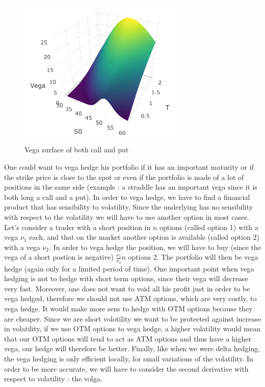 \documentclass[hidelinks]{article}
\begin{document}
    
    \begin{figure}[!h]
	\centering
	\includegraphics[width=0.7\textwidth]{vega.png}
    \caption{Vega surface of both call and put}
    \label{fig:vega}
    \end{figure}
    
    One could want to vega hedge his portfolio if it has an important maturity or if the strike price is close to the spot or even if the portfolio is made of a lot of positions in the same side (example : a straddle has an important vega since it is both long a call and a put). In order to vega hedge, we have to find a financial product that has sensibility to volatility. Since the underlying has no sensibility with respect to the volatility we will have to use another option in most cases. Let's consider a trader with a short position in $n$ options (called option 1) with a vega $\nu_1$ each, and that on the market another option is available (called option 2) with a vega $\nu_2$. In order to vega hedge the position, we will have to buy (since the vega of a short postion is negative) $\frac{\nu_1}{\nu_2}n$ options 2. The portfolio will then be vega hedge (again only for a limited period of time). One important point when vega hedging is not to hedge with short term options, since their vega will decrease very fast. Moreover, one does not want to void all his profit just in order to be vega hedged, therefore we should not use ATM options, which are very costly, to vega hedge. It would make more sens to hedge with OTM options because they are cheaper. Since we are short volotility we want to be protected against increase in volatility, if we use OTM options to vega hedge, a higher volatility would mean that our OTM options will tend to act as ATM options and thus have a higher vega, our hedge will therefore be better.  Finally, like when we were delta hedging, the vega hedging is only efficient locally, for small variations of the volatility. In order to be more accurate, we will have to consider the second derivative with respect to volatility : the volga.
    
\end{document}
